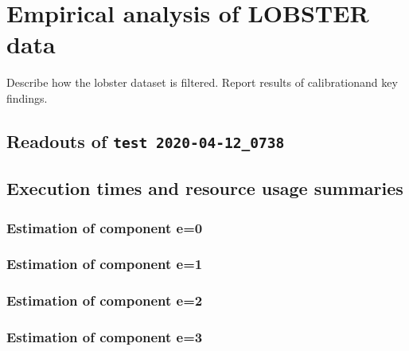 \documentclass[10pt, article,table]{article}
\begin{document}
\section{Empirical analysis of LOBSTER data}
Describe how the lobster dataset is filtered. Report results of calibrationand key findings. 


    


    


\begin{appendices}
\section{Readouts of \texttt{test 2020-04-12\_0738}}
\subsection{Execution times and resource usage summaries}
\subsubsection{Estimation of component e=0}
 \begin{tcolorbox}[breakable, size=fbox, boxrule=1pt, pad at break*=1mm,colframe=cellborder]    
 
\end{tcolorbox}
\subsubsection{Estimation of component e=1}
\begin{tcolorbox}[breakable, size=fbox, boxrule=1pt, pad at break*=1mm,colframe=cellborder]    
 
\end{tcolorbox}
\subsubsection{Estimation of component e=2}
 \begin{tcolorbox}[breakable, size=fbox, boxrule=1pt, pad at break*=1mm,colframe=cellborder]    
 
\end{tcolorbox}
\subsubsection{Estimation of component e=3}
 \begin{tcolorbox}[breakable, size=fbox, boxrule=1pt, pad at break*=1mm,colframe=cellborder]    
 
\end{tcolorbox}
\end{appendices}
\end{document}
